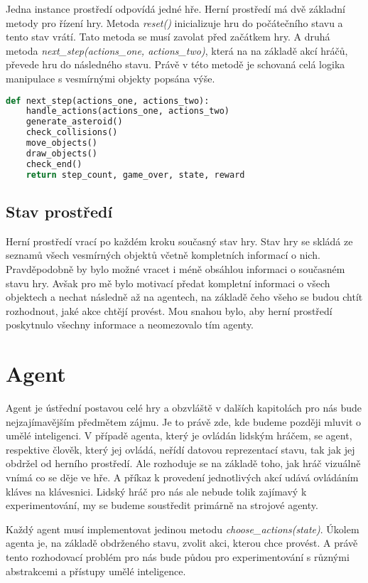 Jedna instance prostředí odpovídá jedné hře. Herní prostředí má dvě základní metody pro řízení hry. 
\newline 
Metoda \emph{reset()} inicializuje hru do počátečního stavu a tento stav vrátí. Tato metoda se musí zavolat před začátkem hry.
\newline 
A druhá metoda \emph{next\_step(actions\_one, actions\_two)}, která na na základě akcí hráčů, převede hru do následného stavu.
Právě v této metodě je schovaná celá logika manipulace s vesmírnými objekty popsána výše.
\newline
\begin{lstlisting}[language=Python]
def next_step(actions_one, actions_two):
    handle_actions(actions_one, actions_two)
    generate_asteroid()
    check_collisions()
    move_objects()
    draw_objects()
    check_end()
    return step_count, game_over, state, reward    
\end{lstlisting}
\newpage



\subsection{Stav prostředí}
Herní prostředí vrací po každém kroku současný stav hry. Stav hry se skládá ze seznamů všech vesmírných objektů včetně kompletních informací o nich.
Pravděpodobně by bylo možné vracet i méně obsáhlou informaci o současném stavu hry. 
Avšak pro mě bylo motivací předat kompletní informaci o všech objektech a nechat následně až na agentech, na základě čeho všeho se budou chtít rozhodnout, jaké akce chtějí provést.
Mou snahou bylo, aby herní prostředí poskytnulo všechny informace a neomezovalo tím agenty.


\section{Agent}
Agent je ústřední postavou celé hry a obzvláště v dalších kapitolách pro nás bude nejzajímavějším předmětem zájmu.
Je to právě zde, kde budeme později mluvit o umělé inteligenci. 
V případě agenta, který je ovládán lidským hráčem, se agent, respektive člověk, který jej ovládá, neřídí datovou reprezentací stavu, tak jak jej obdržel od herního prostředí.
Ale rozhoduje se na základě toho, jak hráč vizuálně vnímá co se děje ve hře. A příkaz k provedení jednotlivých akcí udává ovládáním kláves na klávesnici.
Lidský hráč pro nás ale nebude tolik zajímavý k experimentování, my se budeme soustředit primárně na strojové agenty.
\par
Každý agent musí implementovat jedinou metodu \emph{choose\_actions(state)}. Úkolem agenta je, na základě obdrženého stavu, zvolit akci, kterou chce provést.
A právě tento rozhodovací problém pro nás bude půdou pro experimentování s různými abstrakcemi a přístupy umělé inteligence. 


